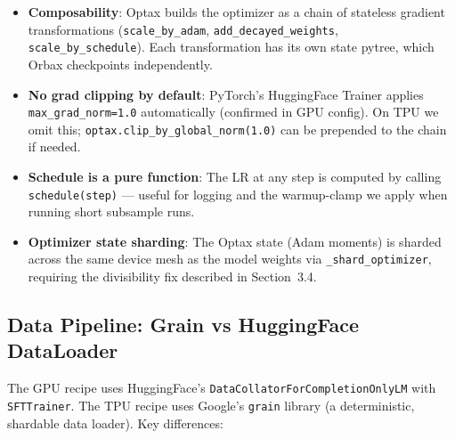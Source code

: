 \documentclass[11pt,a4paper]{article}
\begin{document}
\begin{itemize}[nosep]
  \item \textbf{Composability}: Optax builds the optimizer as a chain of stateless gradient transformations (\texttt{scale\_by\_adam}, \texttt{add\_decayed\_weights}, \texttt{scale\_by\_schedule}). Each transformation has its own state pytree, which Orbax checkpoints independently.
  \item \textbf{No grad clipping by default}: PyTorch's HuggingFace Trainer applies \texttt{max\_grad\_norm=1.0} automatically (confirmed in GPU config). On TPU we omit this; \texttt{optax.clip\_by\_global\_norm(1.0)} can be prepended to the chain if needed.
  \item \textbf{Schedule is a pure function}: The LR at any step is computed by calling \texttt{schedule(step)} — useful for logging and the warmup-clamp we apply when running short subsample runs.
  \item \textbf{Optimizer state sharding}: The Optax state (Adam moments) is sharded across the same device mesh as the model weights via \texttt{\_shard\_optimizer}, requiring the divisibility fix described in Section~3.4.
\end{itemize}

\subsection{Data Pipeline: Grain vs HuggingFace DataLoader}

The GPU recipe uses HuggingFace's \texttt{DataCollatorForCompletionOnlyLM} with \texttt{SFTTrainer}. The TPU recipe uses Google's \texttt{grain} library (a deterministic, shardable data loader). Key differences:
\end{document}

